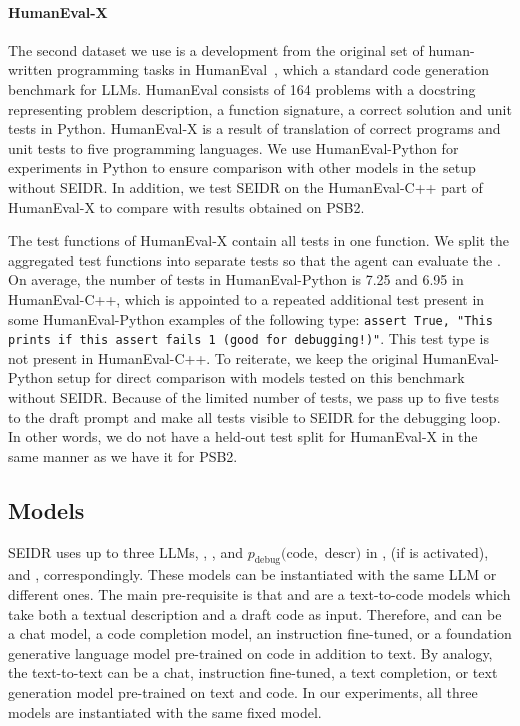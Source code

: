 \paragraph{HumanEval-X}
The second dataset we use is a development from the original set of human-written programming tasks in HumanEval~\cite{chen2021:evaluating}, which a standard code generation benchmark for LLMs.
HumanEval consists of 164 problems with a docstring representing problem description, a function signature, a correct solution and unit tests in Python. 
HumanEval-X is a result of translation of correct programs and unit tests to five programming languages. 
We use HumanEval-Python for experiments in Python to ensure comparison with other models in the setup without SEIDR. 
In addition, we test SEIDR on the HumanEval-C++ part of HumanEval-X to compare with results obtained on PSB2. %

The test functions of HumanEval-X contain all tests in one function. We split the aggregated test functions into separate tests so that the \rank{} agent can evaluate the . 
On average, the number of tests in HumanEval-Python is 7.25 and 6.95 in HumanEval-C++, which is appointed to a repeated additional test present in some HumanEval-Python examples of the following type: \texttt{assert True, "This prints if this assert fails 1 (good for debugging!)"}.
This test type is not present in HumanEval-C++.
To reiterate, we keep the original HumanEval-Python setup for direct comparison with models tested on this benchmark without SEIDR. 
Because of the limited number of tests, we pass up to five tests to the draft prompt and make all tests visible to SEIDR for the debugging loop. 
In other words, we do not have a held-out test split for HumanEval-X in the same manner as we have it for PSB2.


\newpage \subsection{Models}
\label{sec:seidr-models}

SEIDR uses up to three LLMs, \synthmodel{}, \textmodel{}, and 
$p_\text{debug}(\text{code},$ $\text{descr})$
in \synthesize{}, \instruct{} (if \instructllm{} is activated), and \debug{}, correspondingly. 
These models can be instantiated with the same LLM or different ones. 
The main pre-requisite is that \synthmodel{} and \debugmodel{} are a text-to-code models which take both a textual description and a draft code as input.
Therefore, \synthmodel{} and \debugmodel{} can be a chat model, a code completion model, an instruction fine-tuned, or a foundation generative language model pre-trained on code in addition to text. 
By analogy, the text-to-text \textmodel{} can be a chat, instruction fine-tuned, a text completion, or text generation model pre-trained on text and code.
In our experiments, all three models are instantiated with the same fixed model. 

